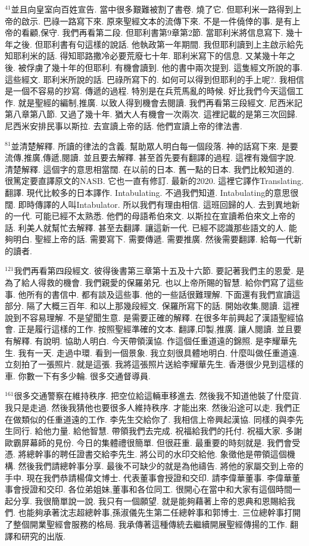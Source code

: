 \documentclass{book}
\begin{document}
$^{41}$並且向皇室向百姓宣告.
當中很多艱難被割了書卷.
燒了它.
但耶利米一路得到上帝的啟示.
巴祿一路寫下來.
原來聖經文本的流傳下來.
不是一件僥倖的事.
是有上帝的看顧,保守.
我們再看第二段.
但耶利書第9章第2節.
當耶利米將信息寫下.
幾十年之後.
但耶利書有句這樣的說話.
他執政第一年期間.
我但耶利讀到上主啟示給先知耶利米的話.
得知耶路撒冷必要荒廢七十年.
耶利米寫下的信息.
又某幾十年之後.
被俘虜了幾十年的但耶利.
有機會讀到.
他的書中兩次提到.
這隻經文所說的事.
這些經文.
耶利米所說的話.
巴祿所寫下的.
如何可以得到但耶利的手上呢?.
我相信是一個不容易的抄寫.
傳遞的過程.
特別是在兵荒馬亂的時候.
好比我們今天這個工作.
就是聖經的編制,推廣.
以致人得到機會去閱讀.
我們再看第三段經文.
尼西米記第八章第八節.
又過了幾十年.
猶大人有機會一次兩次.
這裡記載的是第三次回歸.
尼西米安排民事以斯拉.
去宣讀上帝的話.
他們宣讀上帝的律法書.

$^{81}$並清楚解釋.
所讀的律法的含義.
幫助眾人明白每一個段落.
神的話寫下來.
是要流傳,推廣,傳遞,閱讀.
並且要去解釋.
甚至首先要有翻譯的過程.
這裡有幾個字說.
清楚解釋.
這個字的意思相當闊.
在以前的日本.
舊一點的日本.
我們比較知道的.
很篤定要直譯原文的NASB.
它也一直有修訂.
最新的2020.
這裡它譯作Translating.
翻譯.
現代比較多的日本譯作.
Intabulating.
不過我們知道.
Intabulating的意思很闊.
即時傳譯的人叫Intabulator.
所以我們有理由相信.
這班回歸的人.
去到異地新的一代.
可能已經不太熟悉.
他們的母語希伯來文.
以斯拉在宣讀希伯來文上帝的話.
利美人就幫忙去解釋.
甚至去翻譯.
讓這新一代.
已經不認識那些語文的人.
能夠明白.
聖經上帝的話.
需要寫下.
需要傳遞.
需要推廣.
然後需要翻譯.
給每一代新的讀者.

$^{121}$我們再看第四段經文.
彼得後書第三章第十五及十六節.
要記著我們主的恩愛.
是為了給人得救的機會.
我們親愛的保羅弟兄.
也以上帝所賜的智慧.
給你們寫了這些事.
他所有的書信中.
都有談及這些事.
他的一些話很難理解.
下面還有我們宣讀這部分.
隔了大概三百年.
和以上那幾段經文.
保羅所寫下的話.
開始收集,閱讀.
這裡說到不容易理解.
不是望聞生意.
是需要正確的解釋.
在很多年前興起了漢語聖經協會.
正是履行這樣的工作.
按照聖經準確的文本.
翻譯,印製,推廣.
讓人閱讀.
並且要有解釋.
有說明.
協助人明白.
今天帶領漢協.
作這個任重道遠的錦照.
是李耀華先生.
我有一天.
走過中環.
看到一個景象.
我立刻很具體地明白.
什麼叫做任重道遠.
立刻拍了一張照片.
就是這張.
我將這張照片送給李耀華先生.
香港很少見到這樣的車.
你數一下有多少輪.
很多交通督導員.

$^{161}$很多交通警察在維持秩序.
把空位給這輛車移進去.
然後我不知道他裝了什麼貨.
我只是走過.
然後我猜他也要很多人維持秩序.
才能出來.
然後沿途可以走.
我們正在做類似的任重道遠的工作.
李先生交給你了.
我相信上帝興起漢協.
同樣的與李先生同行.
給他力量.
給他智慧.
帶領我們去完成.
祝福給我們的托付.
祝福大家.
多謝歐霸屏幕師的見份.
今日的集體禮很簡單.
但很莊重.
最重要的時刻就是.
我們會受憑.
將總幹事的聘任證書交給李先生.
將公司的水印交給他.
象徵他是帶領這個機構.
然後我們請總幹事分享.
最後不可缺少的就是為他禱告.
將他的家屬交到上帝的手中.
現在我們恭請楊偉文博士.
代表董事會授證和交印.
請李偉華董事.
李偉華董事會授證和交印.
各位弟姐妹,董事和各位同工.
很開心在當中和大家有這個時間一起分享.
我很簡單說一說.
我只有一個願望.
就是能夠藉著上帝的恩典和恩賜給我們.
也能夠承著沈志超總幹事,孫淑儀先生第二任總幹事和郭博士.
三位總幹事打開了整個開業聖經會服務的格局.
我承傳著這種傳統去繼續開展聖經傳揚的工作.
翻譯和研究的出版.
\end{document}
